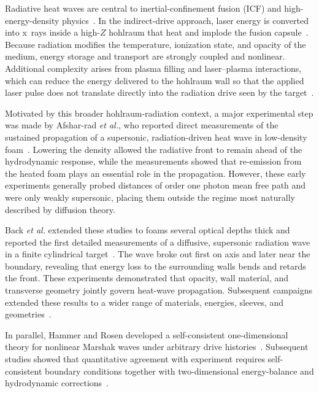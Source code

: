 \documentclass[prl, twocolumn, superscriptaddress, amsmath, amssymb, reprint]{revtex4-2}
\begin{document}
\begingroup
\setlength{\parskip}{0pt}
\setlength{\parindent}{1em}
Radiative heat waves are central to inertial-confinement fusion (ICF) and high-energy-density physics~\cite{Rosen1996}. In the indirect-drive approach, laser energy is converted into x~rays inside a high-$Z$ hohlraum that heat and implode the fusion capsule~\cite{Lindl2004}. Because radiation modifies the temperature, ionization state, and opacity of the medium, energy storage and transport are strongly coupled and nonlinear. Additional complexity arises from plasma filling and laser--plasma interactions, which can reduce the energy delivered to the hohlraum wall so that the applied laser pulse does not translate directly into the radiation drive seen by the target~\cite{Hinkel2006PRL}.

Motivated by this broader hohlraum-radiation context, a major experimental step was made by Afshar-rad \textit{et al.}, who reported direct measurements of the sustained propagation of a supersonic, radiation-driven heat wave in low-density foam~\cite{AfsharRad1994}. Lowering the density allowed the radiative front to remain ahead of the hydrodynamic response, while the measurements showed that re-emission from the heated foam plays an essential role in the propagation. However, these early experiments generally probed distances of order one photon mean free path and were only weakly supersonic, placing them outside the regime most naturally described by diffusion theory.

Back \textit{et al.} extended these studies to foams several optical depths thick and reported the first detailed measurements of a diffusive, supersonic radiation wave in a finite cylindrical target~\cite{Back2000PRL,Back2000POP}. The wave broke out first on axis and later near the boundary, revealing that energy loss to the surrounding walls bends and retards the front. These experiments demonstrated that opacity, wall material, and transverse geometry jointly govern heat-wave propagation. Subsequent campaigns extended these results to a wider range of materials, energies, sleeves, and geometries~\cite{Moore2015,Courtois2024,Keiter2008,Jiang2005,Zhang2010}. 

In parallel, Hammer and Rosen developed a self-consistent one-dimensional theory for nonlinear Marshak waves under arbitrary drive histories~\cite{Hammer2003}. Subsequent studies showed that quantitative agreement with experiment requires self-consistent boundary conditions together with two-dimensional energy-balance and hydrodynamic corrections~\cite{Cohen2018,Cohen2020Key,Courtois2022,Courtois2024}.
\end{document}
